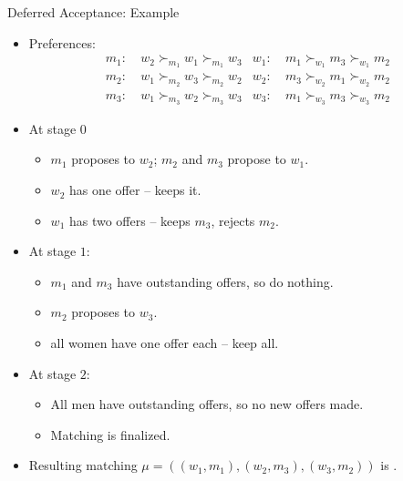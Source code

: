 \documentclass[english,10pt
,aspectratio=169
]{beamer}
\begin{document}
\begin{frame}{Deferred Acceptance: Example}
\begin{example}
	\begin{itemize}
		\item Preferences:
		{\footnotesize
			\begin{align*}
				m_1:& \ w_2 \succ_{m_1} w_1 \succ_{m_1} w_3 	& w_1:& \ m_1 \succ_{w_1} m_3 \succ_{w_1} m_2
				\\
				m_2:& \ w_1 \succ_{m_2} w_3 \succ_{m_2} w_2 	& w_2:& \ m_3 \succ_{w_2} m_1 \succ_{w_2} m_2
				\\
				m_3:& \ w_1 \succ_{m_3} w_2 \succ_{m_3} w_3 	& w_3:& \ m_1 \succ_{w_3} m_3 \succ_{w_3} m_2
			\end{align*}
		}
		\item At stage $0$ 
		\begin{itemize}
			\item $m_1$ proposes to $w_2$; $m_2$ and $m_3$ propose to $w_1$.
			\item $w_2$ has one offer -- keeps it.
			\item $w_1$ has two offers -- keeps $m_3$, rejects $m_2$.
		\end{itemize}
		\item At stage $1$: 
		\begin{itemize}
			\item $m_1$ and $m_3$ have outstanding offers, so do nothing.
			\item $m_2$ proposes to $w_3$.
			\item all women have one offer each -- keep all.
		\end{itemize}
		\item At stage $2$:
		\begin{itemize}
			\item All men have outstanding offers, so no new offers made.
			\item Matching is finalized.
		\end{itemize}
		\item Resulting matching $\mu = \left( (w_1,m_1), (w_2,m_3), (w_3,m_2) \right)$ is .
	\end{itemize}
\end{example}
\end{frame}
\end{document}
